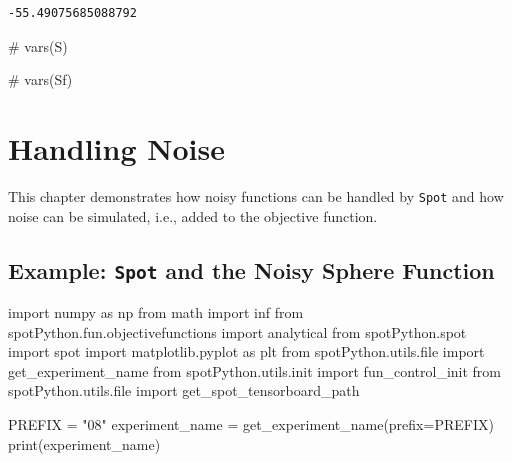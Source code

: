 \documentclass[
  letterpaper,
  DIV=11,
  numbers=noendperiod]{scrreprt}
\newenvironment{Shaded}{\begin{snugshade}}{\end{snugshade}}
\newcommand{\BuiltInTok}[1]{\textcolor[rgb]{0.00,0.23,0.31}{#1}}
\newcommand{\CommentTok}[1]{\textcolor[rgb]{0.37,0.37,0.37}{#1}}
\newcommand{\ImportTok}[1]{\textcolor[rgb]{0.00,0.46,0.62}{#1}}
\newcommand{\NormalTok}[1]{\textcolor[rgb]{0.00,0.23,0.31}{#1}}
\newcommand{\OperatorTok}[1]{\textcolor[rgb]{0.37,0.37,0.37}{#1}}
\newcommand{\StringTok}[1]{\textcolor[rgb]{0.13,0.47,0.30}{#1}}
\begin{document}
\begin{verbatim}
-55.49075685088792
\end{verbatim}

\begin{Shaded}
\begin{Highlighting}[]
\CommentTok{\# vars(S)}
\end{Highlighting}
\end{Shaded}

\begin{Shaded}
\begin{Highlighting}[]
\CommentTok{\# vars(Sf)}
\end{Highlighting}
\end{Shaded}

\hypertarget{sec-noise}{%
\chapter{Handling Noise}\label{sec-noise}}

This chapter demonstrates how noisy functions can be handled by
\texttt{Spot} and how noise can be simulated, i.e., added to the
objective function.

\hypertarget{example-spot-and-the-noisy-sphere-function}{%
\section{\texorpdfstring{Example: \texttt{Spot} and the Noisy Sphere
Function}{Example: Spot and the Noisy Sphere Function}}\label{example-spot-and-the-noisy-sphere-function}}

\begin{Shaded}
\begin{Highlighting}[]
\ImportTok{import}\NormalTok{ numpy }\ImportTok{as}\NormalTok{ np}
\ImportTok{from}\NormalTok{ math }\ImportTok{import}\NormalTok{ inf}
\ImportTok{from}\NormalTok{ spotPython.fun.objectivefunctions }\ImportTok{import}\NormalTok{ analytical}
\ImportTok{from}\NormalTok{ spotPython.spot }\ImportTok{import}\NormalTok{ spot}
\ImportTok{import}\NormalTok{ matplotlib.pyplot }\ImportTok{as}\NormalTok{ plt}
\ImportTok{from}\NormalTok{ spotPython.utils.}\BuiltInTok{file} \ImportTok{import}\NormalTok{ get\_experiment\_name}
\ImportTok{from}\NormalTok{ spotPython.utils.init }\ImportTok{import}\NormalTok{ fun\_control\_init}
\ImportTok{from}\NormalTok{ spotPython.utils.}\BuiltInTok{file} \ImportTok{import}\NormalTok{ get\_spot\_tensorboard\_path}

\NormalTok{PREFIX }\OperatorTok{=} \StringTok{"08"}
\NormalTok{experiment\_name }\OperatorTok{=}\NormalTok{ get\_experiment\_name(prefix}\OperatorTok{=}\NormalTok{PREFIX)}
\BuiltInTok{print}\NormalTok{(experiment\_name)}
\end{Highlighting}
\end{Shaded}
\end{document}
